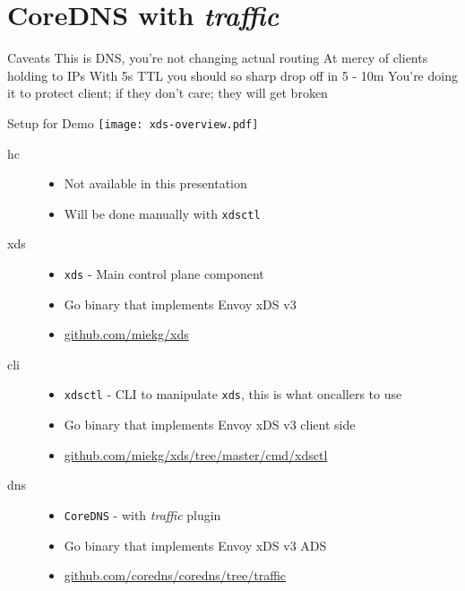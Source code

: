 \documentclass[aspectratio=169]{beamer}
\begin{document}
    \section{CoreDNS with \emph{traffic}}

    \begin{frame}{Caveats}
        This is DNS, you're not changing actual routing
        At mercy of clients holding to IPs
        With 5s TTL you should so sharp drop off in 5 - 10m
        You're doing it to protect client; if they don't care; they will get broken
    \end{frame}

    \begin{frame}{Setup for Demo}
            \texttt{[image: xds-overview.pdf]}
    \end{frame}

    \begin{frame}{}
        \begin{description}
            \item[hc]
                \begin{itemize}
                    \item Not available in this presentation
                    \item Will be done manually with \texttt{xdsctl}
                \end{itemize}
            \item[xds]
                \begin{itemize}
                    \item \texttt{xds} - Main control plane component
                    \item Go binary that implements Envoy xDS v3
                    \item \url{github.com/miekg/xds}
                \end{itemize}
            \item[cli]
                \begin{itemize}
                    \item \texttt{xdsctl} - CLI to manipulate \texttt{xds}, this is what oncallers to use
                    \item Go binary that implements Envoy xDS v3 client side
                    \item \url{github.com/miekg/xds/tree/master/cmd/xdsctl}
                \end{itemize}
            \item[dns]
                \begin{itemize}
                    \item \texttt{CoreDNS} - with \emph{traffic} plugin
                    \item Go binary that implements Envoy xDS v3 ADS
                    \item \url{github.com/coredns/coredns/tree/traffic}
                \end{itemize}
        \end{description}
    \end{frame}
\end{document}
